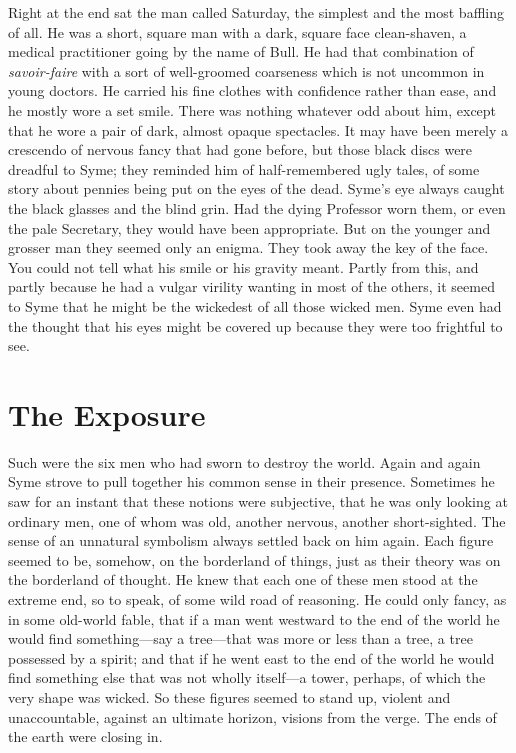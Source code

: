 \documentclass{book}
\begin{document}
Right at the end sat the man called Saturday, the simplest and the most baffling of all. He was a short, square man with a dark, square face clean-shaven, a medical practitioner going by the name of Bull. He had that combination of \emph{savoir-faire} with a sort of well-groomed coarseness which is not uncommon in young doctors. He carried his fine clothes with confidence rather than ease, and he mostly wore a set smile. There was nothing whatever odd about him, except that he wore a pair of dark, almost opaque spectacles. It may have been merely a crescendo of nervous fancy that had gone before, but those black discs were dreadful to Syme; they reminded him of half-remembered ugly tales, of some story about pennies being put on the eyes of the dead. Syme’s eye always caught the black glasses and the blind grin. Had the dying Professor worn them, or even the pale Secretary, they would have been appropriate. But on the younger and grosser man they seemed only an enigma. They took away the key of the face. You could not tell what his smile or his gravity meant. Partly from this, and partly because he had a vulgar virility wanting in most of the others, it seemed to Syme that he might be the wickedest of all those wicked men. Syme even had the thought that his eyes might be covered up because they were too frightful to see.

\chapter{The Exposure}
\label{chapter-5}
Such were the six men who had sworn to destroy the world. Again and again Syme strove to pull together his common sense in their presence. Sometimes he saw for an instant that these notions were subjective, that he was only looking at ordinary men, one of whom was old, another nervous, another short-sighted. The sense of an unnatural symbolism always settled back on him again. Each figure seemed to be, somehow, on the borderland of things, just as their theory was on the borderland of thought. He knew that each one of these men stood at the extreme end, so to speak, of some wild road of reasoning. He could only fancy, as in some old-world fable, that if a man went westward to the end of the world he would find something—say a tree—that was more or less than a tree, a tree possessed by a spirit; and that if he went east to the end of the world he would find something else that was not wholly itself—a tower, perhaps, of which the very shape was wicked. So these figures seemed to stand up, violent and unaccountable, against an ultimate horizon, visions from the verge. The ends of the earth were closing in.
\end{document}
